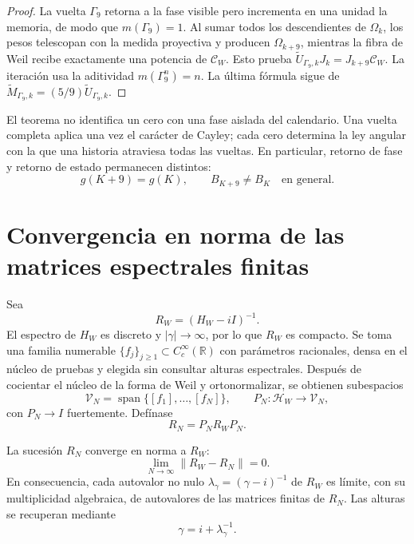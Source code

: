 \begin{proof}
La vuelta \(\Gamma_9\) retorna a la fase visible pero incrementa en una
unidad la memoria, de modo que \(m(\Gamma_9)=1\). Al sumar todos los
descendientes de \(\Omega_k\), los pesos telescopan con la medida proyectiva
y producen \(\Omega_{k+9}\), mientras la fibra de Weil recibe exactamente
una potencia de \(\mathcal C_W\). Esto prueba
\(\widetilde U_{\Gamma_9,k}J_k=J_{k+9}\mathcal C_W\). La iteración usa la
aditividad \(m(\Gamma_9^n)=n\). La última fórmula sigue de
\(\widetilde M_{\Gamma_9,k}=(5/9)\widetilde U_{\Gamma_9,k}\).
\end{proof}

El teorema no identifica un cero con una fase aislada del calendario. Una
vuelta completa aplica una vez el carácter de Cayley; cada cero determina
la ley angular con la que una historia atraviesa todas las vueltas. En
particular, retorno de fase y retorno de estado permanecen distintos:
\[
 g(K+9)=g(K),
 \qquad B_{K+9}\ne B_K\quad\text{en general}.
\]

\section{Convergencia en norma de las matrices espectrales finitas}
\label{sec:cpe-convergencia-resolvente}

Sea
\[
 R_W=(H_W-iI)^{-1}.
\]
El espectro de \(H_W\) es discreto y \(|\gamma|\to\infty\), por lo que
\(R_W\) es compacto. Se toma una familia numerable
\(\{f_j\}_{j\ge1}\subset C_c^\infty(\mathbb R)\) con parámetros racionales,
densa en el núcleo de pruebas y elegida sin consultar alturas espectrales.
Después de cocientar el núcleo de la forma de Weil y ortonormalizar, se
obtienen subespacios
\[
 \mathcal V_N=\operatorname{span}\{[f_1],\ldots,[f_N]\},
 \qquad P_N:\mathcal H_W\to\mathcal V_N,
\]
con \(P_N\to I\) fuertemente. Defínase
\begin{equation}
 R_N=P_NR_WP_N.
 \label{eq:cpe-resolvente-finito}
\end{equation}

\begin{theorem}
\label{thm:cpe-convergencia-norma}
La sucesión \(R_N\) converge en norma a \(R_W\):
\begin{equation}
 \boxed{\lim_{N\to\infty}\|R_W-R_N\|=0.}
 \label{eq:cpe-convergencia-norma}
\end{equation}
En consecuencia, cada autovalor no nulo
\(\lambda_\gamma=(\gamma-i)^{-1}\) de \(R_W\) es límite, con su
multiplicidad algebraica, de autovalores de las matrices finitas de
\(R_N\). Las alturas se recuperan mediante
\begin{equation}
 \gamma=i+\lambda_\gamma^{-1}.
 \label{eq:cpe-recuperacion-altura}
\end{equation}
\end{theorem}

